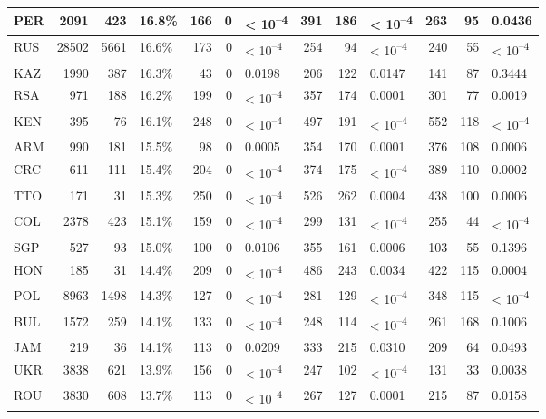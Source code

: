 \begin{tabular}{l|r|r|l|r|r|l|r|r|l|r|r|l}
\hline
PER & 2091 & 423 & 16.8\% & 166 & 0 & < 10\textsuperscript{--4} & 391 & 186 & < 10\textsuperscript{--4} & 263 & 95 & 0.0436\\
\hline
RUS & 28502 & 5661 & 16.6\% & 173 & 0 & < 10\textsuperscript{--4} & 254 & 94 & < 10\textsuperscript{--4} & 240 & 55 & < 10\textsuperscript{--4}\\
\hline
KAZ & 1990 & 387 & 16.3\% & 43 & 0 & 0.0198 & 206 & 122 & 0.0147 & 141 & 87 & 0.3444\\
\hline
RSA & 971 & 188 & 16.2\% & 199 & 0 & < 10\textsuperscript{--4} & 357 & 174 & 0.0001 & 301 & 77 & 0.0019\\
\hline
KEN & 395 & 76 & 16.1\% & 248 & 0 & < 10\textsuperscript{--4} & 497 & 191 & < 10\textsuperscript{--4} & 552 & 118 & < 10\textsuperscript{--4}\\
\hline
ARM & 990 & 181 & 15.5\% & 98 & 0 & 0.0005 & 354 & 170 & 0.0001 & 376 & 108 & 0.0006\\
\hline
CRC & 611 & 111 & 15.4\% & 204 & 0 & < 10\textsuperscript{--4} & 374 & 175 & < 10\textsuperscript{--4} & 389 & 110 & 0.0002\\
\hline
TTO & 171 & 31 & 15.3\% & 250 & 0 & < 10\textsuperscript{--4} & 526 & 262 & 0.0004 & 438 & 100 & 0.0006\\
\hline
COL & 2378 & 423 & 15.1\% & 159 & 0 & < 10\textsuperscript{--4} & 299 & 131 & < 10\textsuperscript{--4} & 255 & 44 & < 10\textsuperscript{--4}\\
\hline
SGP & 527 & 93 & 15.0\% & 100 & 0 & 0.0106 & 355 & 161 & 0.0006 & 103 & 55 & 0.1396\\
\hline
HON & 185 & 31 & 14.4\% & 209 & 0 & < 10\textsuperscript{--4} & 486 & 243 & 0.0034 & 422 & 115 & 0.0004\\
\hline
POL & 8963 & 1498 & 14.3\% & 127 & 0 & < 10\textsuperscript{--4} & 281 & 129 & < 10\textsuperscript{--4} & 348 & 115 & < 10\textsuperscript{--4}\\
\hline
BUL & 1572 & 259 & 14.1\% & 133 & 0 & < 10\textsuperscript{--4} & 248 & 114 & < 10\textsuperscript{--4} & 261 & 168 & 0.1006\\
\hline
JAM & 219 & 36 & 14.1\% & 113 & 0 & 0.0209 & 333 & 215 & 0.0310 & 209 & 64 & 0.0493\\
\hline
UKR & 3838 & 621 & 13.9\% & 156 & 0 & < 10\textsuperscript{--4} & 247 & 102 & < 10\textsuperscript{--4} & 131 & 33 & 0.0038\\
\hline
ROU & 3830 & 608 & 13.7\% & 113 & 0 & < 10\textsuperscript{--4} & 267 & 127 & 0.0001 & 215 & 87 & 0.0158\\

\end{tabular}
